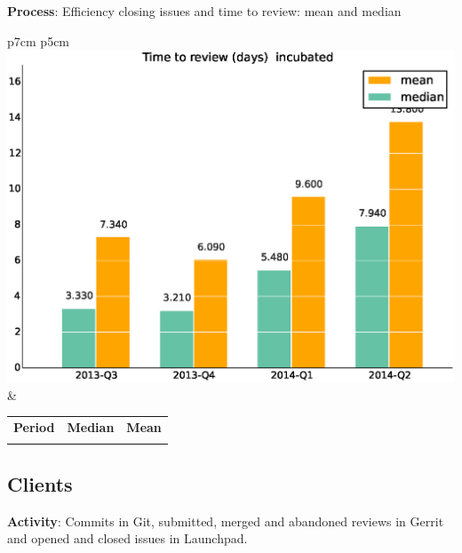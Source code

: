 \documentclass[a4wide,11pt]{report}
\begin{document}
\textbf{Process}: Efficiency closing issues and time to review: mean and median



\begin{tabular}{p{7cm} p{5cm}}
    \vspace{0pt} 
    \includegraphics[scale=.35]{figs/timetoreview_medianincubated.eps}
    & 
    \vspace{0pt}
    \begin{tabular}{l|r|r|}%
    \bfseries Period & \bfseries Median & \bfseries Mean %
    \csvreader[head to column names]{data/timetoreview_medianincubated.csv}{}%
    {\\ & \mediantime & \meantime}
    \end{tabular}
\end{tabular}

\newpage
\subsection{Clients}

\textbf{Activity}: Commits in Git, submitted, merged and abandoned reviews in Gerrit and opened and closed issues in Launchpad.
\end{document}
